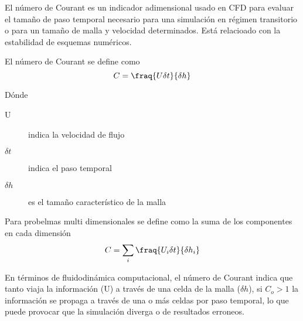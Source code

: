 El número de Courant es un indicador adimensional usado en CFD para evaluar el
tamaño de paso temporal necesario para una simulación en régimen transitorio o
para un tamaño de malla y velocidad determinados. Está relacioado con la
estabilidad de esquemas numéricos.

El número de Courant se define como
\begin{equation}
    C = \fraq{U \delta t}{\delta h}
\end{equation}

Dónde
\begin{description}
    \item [U] indica la velocidad de flujo
    \item [$\delta t$] indica el paso temporal
    \item [$\delta h$] es el tamaño característico de la malla
\end{description}

Para probelmas multi dimensionales se define como la suma de los componentes en
cada dimensión
\begin{equation}
    C = \sum_i \fraq{U_i \delta t}{\delta h_i}
\end{equation}

En términos de fluidodinámica computacional, el número de Courant indica que tanto
viaja la información (U) a través de una celda de la malla ($\delta h$), si $C_o > 1$
la información se propaga a través de una o más celdas por paso temporal, lo que
puede provocar que la simulación diverga o de resultados erroneos.
